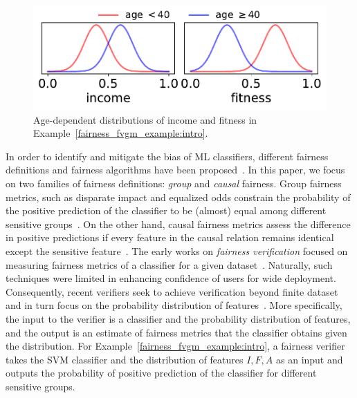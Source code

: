 \begin{figure}[h!]
	\begin{center}
		\includegraphics[scale = 0.4]{figures/fairness/fvgm/sanity_probability}
	\end{center}
	\vspace*{-1em}
	\caption{\footnotesize Age-dependent distributions of income and fitness in Example~\ref{fairness_fvgm_example:intro}.}\label{fairness_fvgm_fig:example1}%
\end{figure}


	In order to identify and mitigate the bias of ML classifiers, different fairness definitions and fairness algorithms have been proposed~\cite{hardt2016equality,kusner2017counterfactual,mehrabi2019survey}.	In this paper, we focus on two families of fairness definitions: \textit{group} and \textit{causal} fairness. Group fairness metrics, such as disparate impact and equalized odds constrain the probability of the positive prediction of the classifier to be (almost) equal among different sensitive groups~\cite{dwork2012fairness,feldman2015certifying}.	On the other hand, causal fairness metrics assess the difference in positive predictions  if every feature in the causal relation  remains identical except the sensitive feature~\cite{nabi2018fair,zhang2018fairness}. The early works on \textit{fairness verification} focused on measuring fairness metrics of a classifier for a given dataset~\cite{aif360-oct-2018}. Naturally, such techniques were limited in enhancing confidence of users for wide deployment. Consequently, recent verifiers seek to achieve verification beyond  finite dataset and in turn focus on the  probability distribution of features~\cite{albarghouthi2017fairsquare, bastani2019probabilistic, ghosh2020justicia}.  More specifically, the input to the verifier is a classifier and  the probability distribution of features, and the output is an estimate of fairness metrics that the classifier obtains given the distribution. For Example~\ref{fairness_fvgm_example:intro}, a fairness verifier takes the SVM classifier and the distribution of features $ I, F, A $ as an input and outputs the probability of positive prediction of the classifier for  different sensitive groups. 
	
